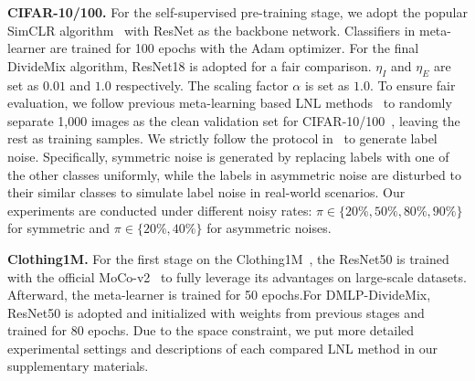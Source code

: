 \documentclass[10pt,twocolumn,letterpaper]{article}
\begin{document}
\textbf{CIFAR-10/100.} For the self-supervised pre-training stage, we adopt the popular SimCLR algorithm~\cite{chen2020simple} with ResNet as the backbone network. Classifiers in meta-learner are trained for 100 epochs with the Adam optimizer. For the final DivideMix algorithm, ResNet18 is adopted for a fair comparison. $\eta_{I}$ and $\eta_{E}$ are set as $0.01$ and $1.0$ respectively. The scaling factor $\alpha$ is set as $1.0$.
To ensure fair evaluation, we follow previous meta-learning based LNL methods~\cite{AAAI-2021-meta,shu2019meta} to randomly separate 1,000 images as the clean validation set for CIFAR-10/100~\cite{datasetcifar10}, {leaving the rest as training samples}. We strictly follow {the protocol in}~\cite{Co-han2018co} to generate label noise. Specifically, symmetric noise is generated by replacing labels with one of the other classes uniformly, while the labels in asymmetric noise are disturbed to their similar classes to simulate label noise in real-world scenarios. {Our experiments are conducted under different noisy rates}: $\pi \in \{20\%,50\%,80\%,90\%\}$ for symmetric and $\pi \in \{20\%,40\%\}$ for asymmetric noises.

\textbf{Clothing1M.} For the first stage on the Clothing1M~\cite{xiao2015learning}, the ResNet50 is trained with the official MoCo-v2~\cite{2020MoCo-v2} to fully leverage its advantages on large-scale datasets. Afterward, the {meta-learner is} trained for 50 epochs.{For DMLP-DivideMix}, ResNet50 is adopted and initialized with weights from previous stages and trained for 80 epochs.
Due to the space constraint, we put more detailed experimental settings and descriptions of each compared LNL method in our supplementary materials.
\end{document}

